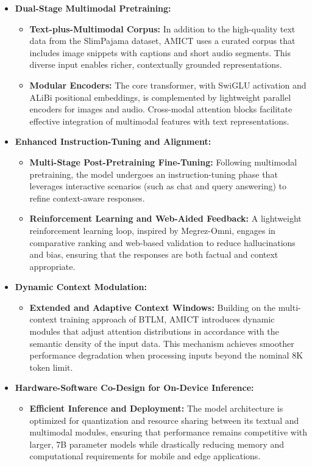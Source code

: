 \documentclass{article} %
\begin{document}
\begin{itemize}
  \item \textbf{Dual-Stage Multimodal Pretraining:}
    \begin{itemize}
      \item \textbf{Text-plus-Multimodal Corpus:} In addition to the high-quality text data from the SlimPajama dataset, AMICT uses a curated corpus that includes image snippets with captions and short audio segments. This diverse input enables richer, contextually grounded representations.
      \item \textbf{Modular Encoders:} The core transformer, with SwiGLU activation and ALiBi positional embeddings, is complemented by lightweight parallel encoders for images and audio. Cross-modal attention blocks facilitate effective integration of multimodal features with text representations.
    \end{itemize}

  \item \textbf{Enhanced Instruction-Tuning and Alignment:}
    \begin{itemize}
      \item \textbf{Multi-Stage Post-Pretraining Fine-Tuning:} Following multimodal pretraining, the model undergoes an instruction-tuning phase that leverages interactive scenarios (such as chat and query answering) to refine context-aware responses.
      \item \textbf{Reinforcement Learning and Web-Aided Feedback:} A lightweight reinforcement learning loop, inspired by Megrez-Omni, engages in comparative ranking and web-based validation to reduce hallucinations and bias, ensuring that the responses are both factual and context appropriate.
    \end{itemize}

  \item \textbf{Dynamic Context Modulation:}
    \begin{itemize}
      \item \textbf{Extended and Adaptive Context Windows:} Building on the multi-context training approach of BTLM, AMICT introduces dynamic modules that adjust attention distributions in accordance with the semantic density of the input data. This mechanism achieves smoother performance degradation when processing inputs beyond the nominal 8K token limit.
    \end{itemize}

  \item \textbf{Hardware-Software Co-Design for On-Device Inference:}
    \begin{itemize}
      \item \textbf{Efficient Inference and Deployment:} The model architecture is optimized for quantization and resource sharing between its textual and multimodal modules, ensuring that performance remains competitive with larger, 7B parameter models while drastically reducing memory and computational requirements for mobile and edge applications.
    \end{itemize}
\end{itemize}
\end{document}
